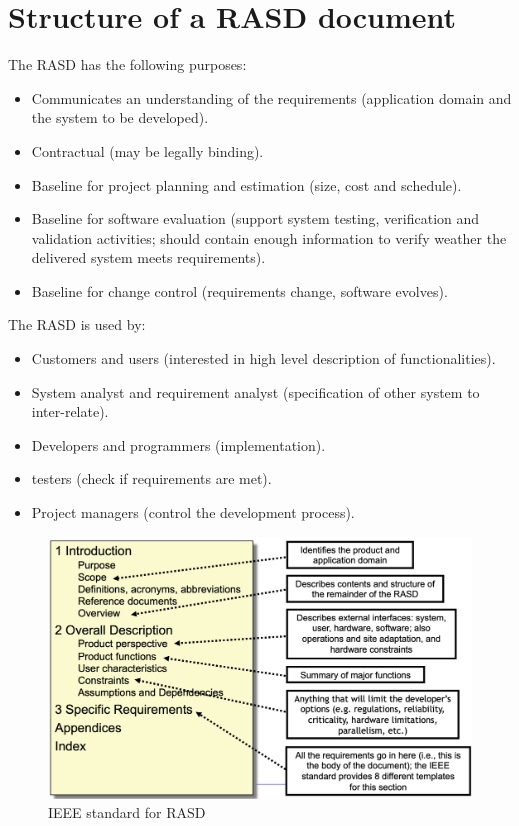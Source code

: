 \documentclass[12pt, a4paper]{report}
\theoremstyle{remark}
\begin{document}
\section{Structure of a RASD document}
    The RASD has the following purposes: 
    \begin{itemize}
        \item Communicates an understanding of the requirements (application domain and the system to be developed).
        \item Contractual (may be legally binding).
        \item Baseline for project planning and estimation (size, cost and schedule).
        \item Baseline for software evaluation (support system testing, verification and validation activities; should contain enough information to verify weather the delivered system meets requirements).
        \item Baseline for change control (requirements change, software evolves).
    \end{itemize}
    The RASD is used by:
    \begin{itemize}
        \item Customers and users (interested in high level description of functionalities).
        \item System analyst and requirement analyst (specification of other system to inter-relate).
        \item Developers and programmers (implementation).
        \item testers (check if requirements are met).
        \item Project managers (control the development process).
    \end{itemize}
    \begin{figure}
        \centering
        \includegraphics[width=1\linewidth]{images/RASD.png}
        \caption{IEEE standard for RASD}
    \end{figure}
\end{document}
